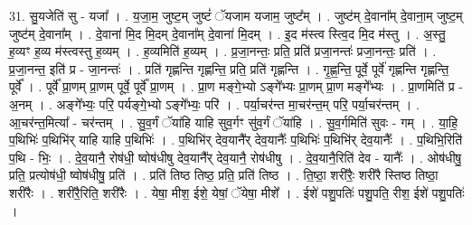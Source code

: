 \documentclass[17pt]{extarticle}
\begin{document}
31. सु॒यजेति॑ सु - यजा᳚ । . य॒जा॒म॒ जुष्ट॒म् जुष्टं॑ ॅयजाम यजाम॒ जुष्ट᳚म् । . जुष्ट॑म् दे॒वाना᳚म् दे॒वाना॒म् जुष्ट॒म् जुष्ट॑म् दे॒वाना᳚म् । . दे॒वाना॑ मि॒द मि॒दम् दे॒वाना᳚म् दे॒वाना॑ मि॒दम् । . इ॒द म॑स्त्व स्त्वि॒द मि॒द म॑स्तु । . अ॒स्तु॒ ह॒व्यꣳ ह॒व्य म॑स्त्वस्तु ह॒व्यम् । . ह॒व्यमिति॑ ह॒व्यम् । . प्र॒जा॒नन्तः॒ प्रति॒ प्रति॑ प्रजा॒नन्तः॑ प्रजा॒नन्तः॒ प्रति॑ । . प्र॒जा॒नन्त॒ इति॑ प्र - जा॒नन्तः॑ । . प्रति॑ गृह्णन्ति गृह्णन्ति॒ प्रति॒ प्रति॑ गृह्णन्ति । . गृ॒ह्ण॒न्ति॒ पूर्वे॒ पूर्वे॑ गृह्णन्ति गृह्णन्ति॒ पूर्वे᳚ । . पूर्वे᳚ प्रा॒णम् प्रा॒णम् पूर्वे॒ पूर्वे᳚ प्रा॒णम् । . प्रा॒ण मङ्गे॒भ्यो ऽङ्गे᳚भ्यः प्रा॒णम् प्रा॒ण मङ्गे᳚भ्यः । . प्रा॒णमिति॑ प्र - अ॒नम् । . अङ्गे᳚भ्यः॒ परि॒ पर्यङ्गे॒भ्यो ऽङ्गे᳚भ्यः॒ परि॑ । . पर्या॒चर॑न्त मा॒चर॑न्त॒म् परि॒ पर्या॒चर॑न्तम् । . आ॒चर॑न्त॒मित्या᳚ - चर॑न्तम् । . सु॒व॒र्गं ॅया॑हि याहि सुव॒र्गꣳ सु॑व॒र्गं ॅया॑हि । . सु॒व॒र्गमिति॑ सुवः - गम् । . या॒हि॒ प॒थिभिः॑ प॒थिभि॑र् याहि याहि प॒थिभिः॑ । . प॒थिभि॑र् देव॒यानै᳚र् देव॒यानैः᳚ प॒थिभिः॑ प॒थिभि॑र् देव॒यानैः᳚ । . प॒थिभि॒रिति॑ प॒थि - भिः॒ । . दे॒व॒यानै॒ रोष॑धी॒ ष्वोष॑धीषु देव॒यानै᳚र् देव॒यानै॒ रोष॑धीषु । . दे॒व॒यानै॒रिति॑ देव - यानैः᳚ । . ओष॑धीषु॒ प्रति॒ प्रत्योष॑धी॒ ष्वोष॑धीषु॒ प्रति॑ । . प्रति॑ तिष्ठ तिष्ठ॒ प्रति॒ प्रति॑ तिष्ठ । . ति॒ष्ठा॒ शरी॑रैः॒ शरी॑रै स्तिष्ठ तिष्ठा॒ शरी॑रैः । . शरी॑रै॒रिति॒ शरी॑रैः । . येषा॒ मीश॒ ईशे॒ येषां॒ ॅयेषा॒ मीशे᳚ । . ईशे॑ पशु॒पतिः॑ पशु॒पति॒ रीश॒ ईशे॑ पशु॒पतिः॑ । \newline
\pagebreak
{}
\end{document}
